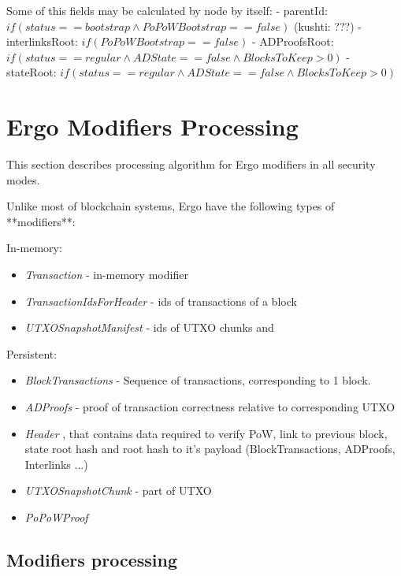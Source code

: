 \documentclass[]{report}   %
\begin{document}
Some of this fields may be calculated by node by itself:
- parentId: $if(status==bootstrap \land PoPoWBootstrap == false)$ (kushti: ???)
- interlinksRoot: $if(PoPoWBootstrap == false)$
- ADProofsRoot: $if(status==regular \land ADState==false \land BlocksToKeep>0)$ 
- stateRoot: $if(status==regular \land ADState==false \land BlocksToKeep>0)$ 

\section{Ergo Modifiers Processing}

This section describes processing algorithm for Ergo modifiers in all security modes.

Unlike most of blockchain systems, Ergo have the following types of **modifiers**:

In-memory:
\begin{itemize}
  \item{\em Transaction} - in-memory modifier
  \item{\em TransactionIdsForHeader} - ids of transactions of a block
  \item{\em UTXOSnapshotManifest} - ids of UTXO chunks and 
\end{itemize}

Persistent:
\begin{itemize}
  \item{\em BlockTransactions}  - Sequence of transactions, corresponding to 1 block.
  \item{\em ADProofs} - proof of transaction correctness relative to corresponding UTXO
  \item{\em Header} , that contains data required to verify PoW, link to previous block, state root hash and root hash to it's payload (BlockTransactions, ADProofs, Interlinks ...)
  \item{\em UTXOSnapshotChunk} - part of UTXO
  \item{\em PoPoWProof}
\end{itemize}

\subsection{Modifiers processing}


\end{document}
